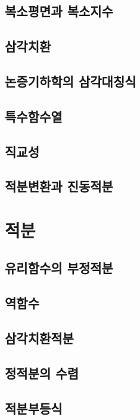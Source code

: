 \documentclass{../prb}
\begin{document}
\section{복소평면과 복소지수}

\section{삼각치환}

\section{논증기하학의 삼각대칭식}

\section{특수함수열}

\section{직교성}

\section{적분변환과 진동적분}











\chapter{적분}

\section{유리함수의 부정적분}

\section{역함수}

\section{삼각치환적분}

\section{정적분의 수렴}

\section{적분부등식}
\end{document}
